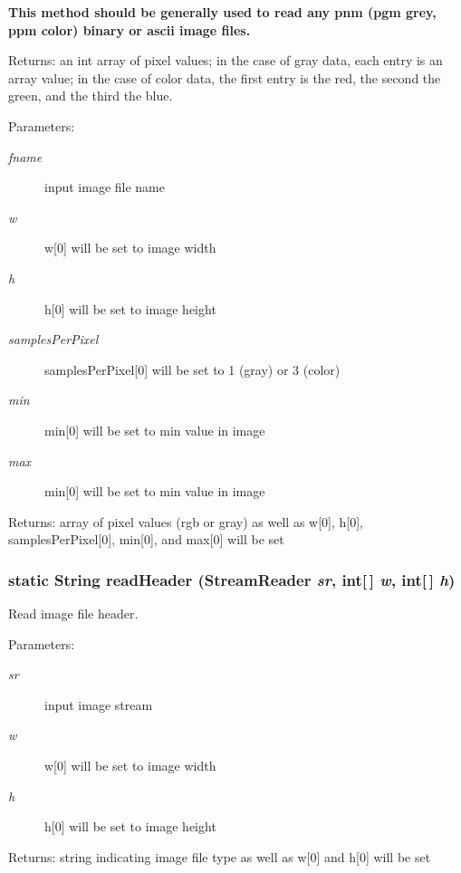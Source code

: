 {\bf  This method should be generally used to read any pnm (pgm grey, ppm color) binary or ascii image files. } 

\begin{Desc}
\item[Returns:]an int array of pixel values; in the case of gray data, each entry is an array value; in the case of color data, the first entry is the red, the second the green, and the third the blue.\end{Desc}
\begin{Desc}
\item[Parameters:]
\begin{description}
\item[{\em fname}]input image file name \item[{\em w}]w[0] will be set to image width \item[{\em h}]h[0] will be set to image height \item[{\em samples\-Per\-Pixel}]samples\-Per\-Pixel[0] will be set to 1 (gray) or 3 (color) \item[{\em min}]min[0] will be set to min value in image \item[{\em max}]min[0] will be set to min value in image\end{description}
\end{Desc}
\begin{Desc}
\item[Returns:]array of pixel values (rgb or gray) as well as w[0], h[0], samples\-Per\-Pixel[0], min[0], and max[0] will be set \end{Desc}
\subsubsection{\setlength{\rightskip}{0pt plus 5cm}static String read\-Header (Stream\-Reader {\em sr}, int[$\,$] {\em w}, int[$\,$] {\em h})\hspace{0.3cm}{\tt  [static, protected]}}\label{class_c_s_image_viewer_1_1pnm_helper_6767fccaf89d076447d11791292e67ae}


Read image file header. 

\begin{Desc}
\item[Parameters:]
\begin{description}
\item[{\em sr}]input image stream \item[{\em w}]w[0] will be set to image width \item[{\em h}]h[0] will be set to image height\end{description}
\end{Desc}
\begin{Desc}
\item[Returns:]string indicating image file type as well as w[0] and h[0] will be set \end{Desc}
